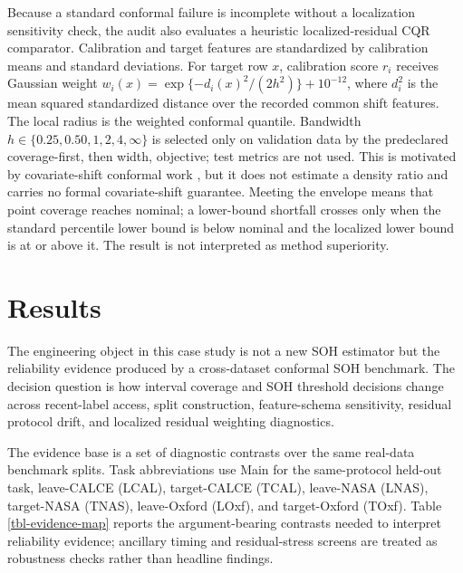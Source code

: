 \documentclass[
  number,
  preprint]{elsarticle}
\begin{document}
Because a standard conformal failure is incomplete without a
localization sensitivity check, the audit also evaluates a heuristic
localized-residual CQR comparator. Calibration and target features are
standardized by calibration means and standard deviations. For target
row \(x\), calibration score \(r_i\) receives Gaussian weight
\(w_i(x)=\exp\{-d_i(x)^2/(2h^2)\}+10^{-12}\), where \(d_i^2\) is the
mean squared standardized distance over the recorded common shift
features. The local radius is the weighted conformal quantile. Bandwidth
\(h\in\{0.25,0.50,1,2,4,\infty\}\) is selected only on validation data
by the predeclared coverage-first, then width, objective; test metrics
are not used. This is motivated by covariate-shift conformal work
\citep{tibshirani2019covariate}, but it does not estimate a density
ratio and carries no formal covariate-shift guarantee. Meeting the
envelope means that point coverage reaches nominal; a lower-bound
shortfall crosses only when the standard percentile lower bound is below
nominal and the localized lower bound is at or above it. The result is
not interpreted as method superiority.

\section{Results}\label{sec-results}

The engineering object in this case study is not a new SOH estimator but
the reliability evidence produced by a cross-dataset conformal SOH
benchmark. The decision question is how interval coverage and SOH
threshold decisions change across recent-label access, split
construction, feature-schema sensitivity, residual protocol drift, and
localized residual weighting diagnostics.

The evidence base is a set of diagnostic contrasts over the same
real-data benchmark splits. Task abbreviations use Main for the
same-protocol held-out task, leave-CALCE (LCAL), target-CALCE (TCAL),
leave-NASA (LNAS), target-NASA (TNAS), leave-Oxford (LOxf), and
target-Oxford (TOxf). Table \ref{tbl-evidence-map} reports the
argument-bearing contrasts needed to interpret reliability evidence;
ancillary timing and residual-stress screens are treated as robustness
checks rather than headline findings.
\end{document}
